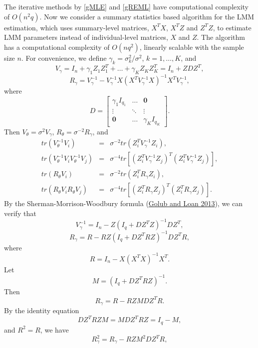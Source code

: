 \documentclass[
]{article}
\begin{document}
The iterative methods by \eqref{gMLE} and \eqref{gREML} have
computational complexity of \(O(n^2q)\). Now we consider a summary
statistics based algorithm for the LMM estimation, which uses
summary-level matrices, \(X^TX\), \(X^TZ\) and \(Z^TZ\), to estimate LMM
parameters instead of individual-level matrices, \(X\) and \(Z\). The
algorithm has a computational complexity of \(O(nq^2)\), linearly
scalable with the sample size \(n\). For convenience, we define
\(\gamma_k = \sigma^2_k/\sigma^2\), \(k = 1,\ldots,K\), and
\[V_{\gamma} = I_n + \gamma_1 Z_1Z_1^T +\ldots+\gamma_KZ_KZ_K^T= I_n+ZDZ^T,\]
\[
R_{\gamma} = V_{\gamma}^{-1} - V_{\gamma}^{-1}X(X^TV_{\gamma}^{-1}X)^{-1}X^TV_{\gamma}^{-1},
\] where \[
D = \begin{bmatrix} \gamma_1I_{q_1} &\ldots & \mathbf{0}\\
\vdots &\ddots &\vdots\\
\mathbf{0} &\ldots &\gamma_KI_{q_{K}}
\end{bmatrix}.
\] Then \(V_{\theta} = \sigma^2V_{\gamma}\),
\(R_{\theta} = \sigma^{-2}R_{\gamma}\), and
\begin{equation}\label{formTr}
\begin{array}{rcl}
tr(V_{\theta}^{-1}V_i) &=& \sigma^{-2}tr(Z_i^TV_{\gamma}^{-1}Z_i),\\
tr(V_{\theta}^{-1}V_iV_{\theta}^{-1}V_j) &=&  \sigma^{-4}tr[(Z_i^TV_{\gamma}^{-1}Z_j)^T(Z_i^TV_{\gamma}^{-1}Z_j)],\\
tr(R_{\theta}V_i) &=&  \sigma^{-2}tr(Z_i^TR_{\gamma}Z_i),\\
tr(R_{\theta}V_iR_{\theta}V_j) &=&  \sigma^{-4}tr[(Z_i^TR_{\gamma}Z_j)^T(Z_i^TR_{\gamma}Z_j)].
\end{array}
\end{equation} By the Sherman-Morrison-Woodbury formula
(\protect\hyperlink{ref-Golub2013}{Golub and Loan 2013}), we can verify
that \[
V_{\gamma}^{-1} = I_n - Z(I_q + DZ^TZ)^{-1}DZ^T,
\] \[
R_{\gamma} = R - RZ(I_q + DZ^TRZ)^{-1}DZ^TR,
\] where \[
R = I_n - X(X^TX)^{-1}X^T.
\] Let \begin{equation}\label{covarM}
M=(I_q + DZ^TRZ)^{-1}.
\end{equation} Then \[R_{\gamma} = R - RZMDZ^TR.\] By the identity
equation \[
DZ^TRZM = MDZ^TRZ = I_q - M,
\] and \(R^2=R\), we have \[R_{\gamma}^2 = R_{\gamma} - RZM^2DZ^TR,\]
\end{document}
